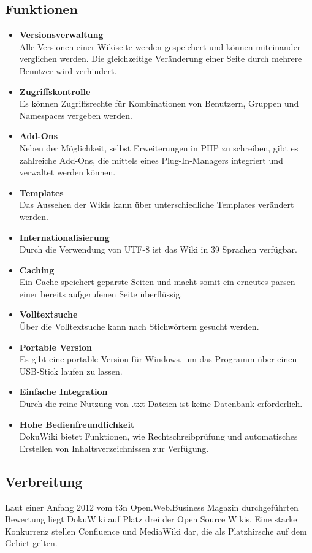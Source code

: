 \documentclass[a4paper, 12pt]{article}
\begin{document}
\subsection*{Funktionen}
\begin{itemize}
\item \textbf{Versionsverwaltung}
\\
Alle Versionen einer Wikiseite werden gespeichert und können miteinander verglichen werden. Die gleichzeitige Veränderung einer Seite durch mehrere Benutzer wird verhindert.
\item \textbf{Zugriffskontrolle}
\\
Es können Zugriffsrechte für Kombinationen von Benutzern, Gruppen und Namespaces vergeben werden.
\item \textbf{Add-Ons}
\\
Neben der Möglichkeit, selbst Erweiterungen in PHP zu schreiben, gibt es zahlreiche Add-Ons, die mittels eines Plug-In-Managers integriert und verwaltet werden können.
\item \textbf{Templates}
\\
Das Aussehen der Wikis kann über unterschiedliche Templates verändert werden.
\item \textbf{Internationalisierung}
\\
Durch die Verwendung von UTF-8 ist das Wiki in 39 Sprachen verfügbar.
\item \textbf{Caching}
\\
Ein Cache speichert geparste Seiten und macht somit ein erneutes parsen einer bereits aufgerufenen Seite überflüssig.
\item \textbf{Volltextsuche}
\\
Über die Volltextsuche kann nach Stichwörtern gesucht werden.
\item \textbf{Portable Version}
\\
Es gibt eine portable Version für Windows, um das Programm über einen USB-Stick laufen zu lassen.
\item \textbf{Einfache Integration}
\\
Durch die reine Nutzung von .txt Dateien ist keine Datenbank erforderlich.
\item \textbf{Hohe Bedienfreundlichkeit}
\\
DokuWiki bietet Funktionen, wie Rechtschreibprüfung und automatisches Erstellen von Inhaltsverzeichnissen zur Verfügung.
\end{itemize}

\subsection*{Verbreitung}
Laut einer Anfang 2012 vom t3n Open.Web.Business Magazin durchgeführten Bewertung liegt DokuWiki auf Platz drei der Open Source Wikis. Eine starke Konkurrenz stellen Confluence und MediaWiki dar, die als Platzhirsche auf dem Gebiet gelten.
\end{document}
